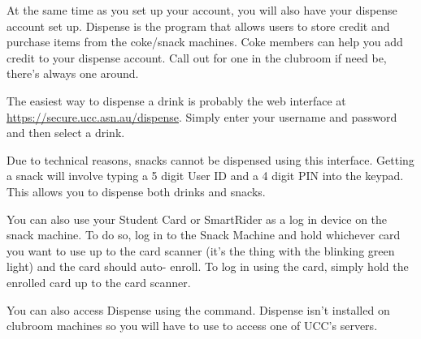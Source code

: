 

At the same time as you set up your account, you will also have your dispense account set up. Dispense is the program that allows users to store credit and purchase items from the coke/snack machines. Coke members can help you add credit to your dispense account. Call out for one in the clubroom if need be, there's always one around.


The easiest way to dispense a drink is probably the web interface at \url{https://secure.ucc.asn.au/dispense}. Simply enter your username and password and then select a drink. 

Due to technical reasons, snacks cannot be dispensed using this interface. Getting a snack will involve typing a 5 digit User ID and a 4 digit PIN into the keypad. This allows you to dispense both drinks and snacks.

You can also use your Student Card or SmartRider as a log in device on the snack machine. To do so, log in to the Snack Machine and hold whichever card you want to use up to the card scanner (it's the thing with the blinking green light) and the card should auto- enroll. To log in using the card, simply hold the enrolled card up to the card scanner.


You can also access Dispense using the  command. Dispense isn't installed on clubroom machines so you will have to use  to access one of UCC's servers.

